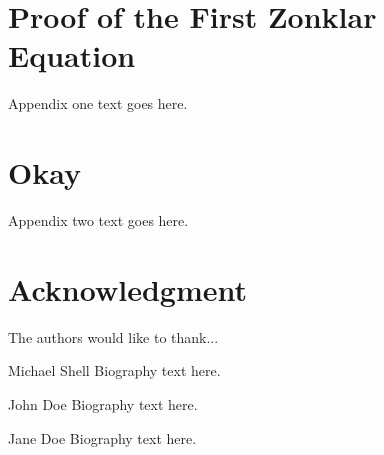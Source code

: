 \documentclass[journal,comsoc]{IEEEtran}
\let\MYoriglatexcaption\caption
\renewcommand{\caption}[2][\relax]{\MYoriglatexcaption[#2]{#2}}
\begin{document}









\appendices
\section{Proof of the First Zonklar Equation}
Appendix one text goes here.

\section{Okay}
Appendix two text goes here.


\section*{Acknowledgment}


The authors would like to thank...

\ifCLASSOPTIONcaptionsoff
  \newpage
\fi



\begin{IEEEbiography}{Michael Shell}
Biography text here.
\end{IEEEbiography}

\begin{IEEEbiographynophoto}{John Doe}
Biography text here.
\end{IEEEbiographynophoto}


\begin{IEEEbiographynophoto}{Jane Doe}
Biography text here.
\end{IEEEbiographynophoto}
\end{document}
